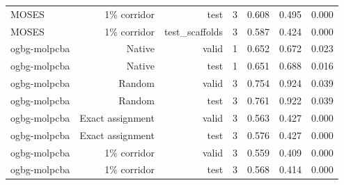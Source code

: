\begin{longtable}{lrrrrrr}
MOSES & 1\% corridor & test & 3 & 0.608 & 0.495 & 0.000\\
MOSES & 1\% corridor & test\_scaffolds & 3 & 0.587 & 0.424 & 0.000\\
ogbg-molpcba & Native & valid & 1 & 0.652 & 0.672 & 0.023\\
ogbg-molpcba & Native & test & 1 & 0.651 & 0.688 & 0.016\\
ogbg-molpcba & Random & valid & 3 & 0.754 & 0.924 & 0.039\\
ogbg-molpcba & Random & test & 3 & 0.761 & 0.922 & 0.039\\
ogbg-molpcba & Exact assignment & valid & 3 & 0.563 & 0.427 & 0.000\\
ogbg-molpcba & Exact assignment & test & 3 & 0.576 & 0.427 & 0.000\\
ogbg-molpcba & 1\% corridor & valid & 3 & 0.559 & 0.409 & 0.000\\
ogbg-molpcba & 1\% corridor & test & 3 & 0.568 & 0.414 & 0.000\\
\end{longtable}
